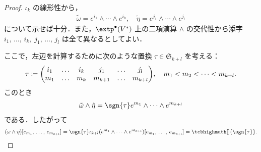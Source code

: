 \documentclass[geometry_main]{subfiles}
\begin{document}
\begin{proof} 
	$\iota_k$ の線形性から，
	\begin{align} 
		\tilde{\omega} = e^{i_1} \wedge \cdots \wedge e^{i_k},\quad \tilde{\eta} = e^{j_1} \wedge \cdots \wedge e^{j_{l}}
	\end{align}
	について示せば十分．また，$\extp^\bullet(V^*)$ 上の二項演算 $\wedge$ の交代性から添字 $i_1,\, \dots ,\, i_k,\; j_1, \, \dots ,\, j_l$ は全て異なるとしてよい．
	
	ここで，左辺を計算するために次のような置換 $\tau \in \mathfrak{S}_{k+l}$ を考える：
	\begin{align} 
		\tau \coloneqq \mqty(i_1 & \dots & i_k & j_1 & \dots & j_l \\ m_1 & \dots & m_k & m_{k+1} & \dots & m_{k+l}),\quad m_1 < m_2 < \cdots < m_{k+l}.
	\end{align}
	このとき
	\begin{align} 
		\tilde{\omega} \wedge \tilde{\eta} = \sgn{\tau} e^{m_1} \wedge \cdots \wedge e^{m_{k+l}}
	\end{align}
	である．したがって
	\begin{align} 
		(\omega \wedge \eta)[e_{m_1},\, \dots ,\, e_{m_{k+l}}] = \sgn{\tau} \iota_{k+l}( e^{m_1} \wedge \cdots \wedge e^{m_{k+l}} )[e_{m_1},\, \dots ,\, e_{m_{k+l}}] = \tcbhighmath[]{\sgn{\tau}}.
	\end{align}
	

\end{proof}
\end{document}
